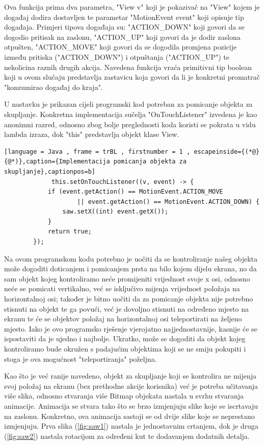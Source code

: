 \documentclass[times, utf8, zavrsni, numeric]{fer}
\begin{document}
	Ova funkcija prima dva parametra, "View v" koji je pokazivač na "View" kojem je događaj dodira dostavljen te parametar "MotionEvent event" koji opisuje tip događaja. Primjeri tipova događaja su: 
	"ACTION\_DOWN" koji govori da se dogodio pritisak na zaslonu, "ACTION\_UP" koji govori da je dodir zaslona otpušten, "ACTION\_MOVE" koji govori da se dogodila promjena pozicije između pritiska ("ACTION\_DOWN") i otpuštanja
	("ACTION\_UP") te nekolicina raznih drugih akcija. Navedena funkcija vraća primitivni tip boolean koji u ovom slučaju predstavlja zastavicu koja govori da li je konkretni promatrač "konzumirao događaj do kraja".
	
	U nastavku je prikazan cijeli programski kod potreban za pomicanje objekta za skupljanje. Konkretna implementacija sučelja "OnTouchListener" izvedena je kao anonimni razred, odnosno zbog bolje preglednosti koda 
	koristi se pokrata u vidu lambda izraza, dok "this" predstavlja objekt klase View.
		 \renewcommand{\lstlistingname}{Kôd}
		\begin{lstlisting}[language = Java , frame = trBL , firstnumber = 1 , escapeinside={(*@}{@*)},caption={Implementacija pomicanja objekta za skupljanje},captionpos=b]
			 this.setOnTouchListener((v, event) -> {
            if (event.getAction() == MotionEvent.ACTION_MOVE 
					|| event.getAction() == MotionEvent.ACTION_DOWN) {
                saw.setX((int) event.getX());
            }
            return true;
        });
		\end{lstlisting}


		
	Na ovom programskom kodu potrebno je uočiti da se kontroliranje našeg objekta može dogoditi doticanjem i pomicanjem prsta na bilo kojem dijelu ekrana, no da sam objekt kojeg kontroliramo neće promijeniti 
	vrijednost svoje x osi, odnosno neće se pomicati vertikalno, već se isključivo mijenja vrijednost položaja na horizontalnoj osi; također je bitno uočiti da za pomicanje objekta nije potrebno stisnuti na objekt
	te ga povući, već je dovoljno stisnuti na određeno mjesto na ekranu te će se objektov položaj na horizontalnoj  osi teleportirati na željeno mjesto. Iako je ovo programsko rješenje vjerojatno najjednostavnije, 
	kasnije će se ispostaviti da je ujedno i najbolje. Ukratko, može se dogoditi da objekt kojeg kontroliramo bude okružen s padajućim objektima koji se ne smiju pokupiti i stoga je ova mogućnost "teleportiranja" poželjna.
	
	
	Kao što je već ranije navedeno, objekt za skupljanje koji se kontrolira ne mijenja svoj položaj na ekranu (bez prethodne akcije korisnika) već je potreba učitavanja više slika, odnosno stvaranja više Bitmap 
	objekata nastala u svrhu stvaranja animacije. Animacija se stvara tako što se brzo izmjenjuju slike koje se iscrtavaju na zaslonu. Konkretno, ova animacija sastoji se od dvije slike koje se neprestano izmjenjuju.
	Prva slika (\ref{fig:saw1}) nastala je jednostavnim crtanjem, dok je druga (\ref{fig:saw2}) nastala rotacijom za određeni kut te dodavanjem dodatnih detalja. 
	
\end{document}
